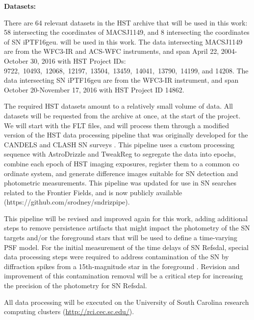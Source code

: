 \textbf{Datasets:}

There are 64 relevant datasets in the HST archive that will be used in this work: 58 
intersecting the coordinates of MACSJ1149, and 8 intersecting the coordinates of SN iPTF16geu.
will be used in this work. The data intersecting MACSJ1149 are from the WFC3-IR and 
ACS-WFC instruments, and span April 22, 2004-October 30, 2016 with HST Project IDs: 9722,\ 
10493,\ 12068,\ 12197,\ 13504,\ 13459,\ 14041,\  13790,\ 14199, and 14208. The data intersecting 
SN iPTF16geu are from the WFC3-IR instrument, and span October 20-November 17, 2016 with HST
Project ID 14862.

The required HST datasets amount to a relatively small volume of data.
All datasets will be requested from the archive at once, at the start
of the project. We will start with the FLT files, and will process
them through a modified version of the HST data processing pipeline
that was originally developed for the CANDELS and CLASH SN surveys
\citep{Rodney:2014}.  This pipeline uses a custom processing sequence
with AstroDrizzle and TweakReg to segregate the data into epochs,
combine each epoch of HST imaging exposures, register them to a common
co ordinate system, and generate difference images suitable for SN
detection and photometric measurements. This pipeline was updated for
use in SN searches related to the Frontier Fields, and is now publicly
available (https://github.com/srodney/sndrizpipe). 

This pipeline will be revised and improved again for this work, adding
additional steps to remove persistence artifacts that might impact the
photometry of the SN targets and/or the foreground stars that will be
used to define a time-varying PSF model. For the initial measurement
of the time delays of SN Refsdal, special data processing steps were
required to address contamination of the SN by diffraction spikes from
a 15th-magnitude star in the foreground \citep{Rodney:2016}.  Revision
and improvement of this contamination removal will be a critical step
for increasing the precision of the photometry for SN Refsdal.

All data processing will be executed on the University of South
Carolina research computing clusters (\url{http://rci.cec.sc.edu/}).


